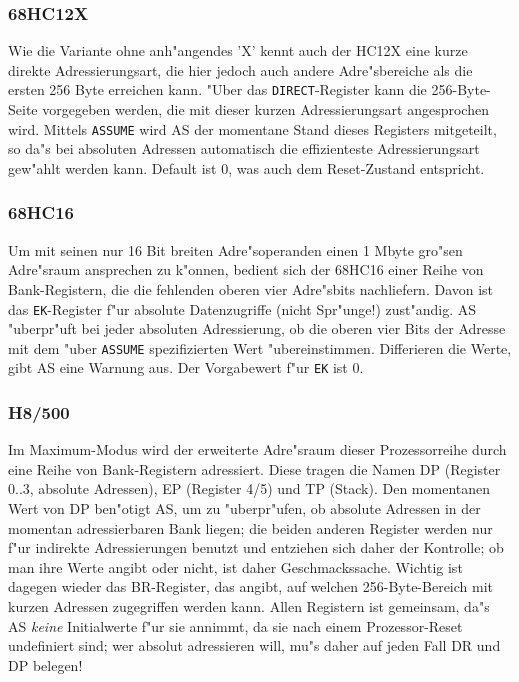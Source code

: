 \documentclass[12pt,a4paper,twoside]{report}
\newcommand{\tty}[1]{{\tt #1}}
\begin{document}

\subsubsection{68HC12X}

Wie die Variante ohne anh"angendes 'X' kennt auch der HC12X eine kurze
direkte Adressierungsart, die hier jedoch auch andere Adre"sbereiche als
die ersten 256 Byte erreichen kann.  "Uber das {\tt DIRECT}-Register kann
die 256-Byte-Seite vorgegeben werden, die mit dieser kurzen
Adressierungsart angesprochen wird.  Mittels {\tt ASSUME} wird AS der
momentane Stand dieses Registers mitgeteilt, so da"s bei absoluten
Adressen automatisch die effizienteste Adressierungsart gew"ahlt werden
kann.  Default ist 0, was auch dem Reset-Zustand entspricht.

\subsubsection{68HC16}

Um mit seinen nur 16 Bit breiten Adre"soperanden einen 1 Mbyte gro"sen
Adre"sraum ansprechen zu k"onnen, bedient sich der 68HC16 einer Reihe
von Bank-Registern, die die fehlenden oberen vier Adre"sbits nachliefern.
Davon ist das \tty{EK}-Register f"ur absolute Datenzugriffe (nicht
Spr"unge!) zust"andig.  AS "uberpr"uft bei jeder absoluten Adressierung,
ob die oberen vier Bits der Adresse mit dem "uber \tty{ASSUME}
spezifizierten Wert "ubereinstimmen.  Differieren die Werte, gibt AS eine
Warnung aus.  Der Vorgabewert f"ur \tty{EK} ist 0.


\subsubsection{H8/500}

Im Maximum-Modus wird der erweiterte Adre"sraum dieser Prozessorreihe
durch eine Reihe von Bank-Registern adressiert.  Diese tragen die
Namen DP (Register 0..3, absolute Adressen), EP (Register 4/5) und
TP (Stack).  Den momentanen Wert von DP ben"otigt AS, um zu "uberpr"ufen,
ob absolute Adressen in der momentan adressierbaren Bank liegen;
die beiden anderen Register werden nur f"ur indirekte Adressierungen
benutzt und entziehen sich daher der Kontrolle; ob man ihre Werte
angibt oder nicht, ist daher Geschmackssache.  Wichtig ist dagegen
wieder das BR-Register, das angibt, auf welchen 256-Byte-Bereich
mit kurzen Adressen zugegriffen werden kann.  Allen Registern ist
gemeinsam, da"s AS {\em keine} Initialwerte f"ur sie annimmt, da sie nach
einem Prozessor-Reset undefiniert sind; wer absolut adressieren
will, mu"s daher auf jeden Fall DR und DP belegen!
\end{document}
